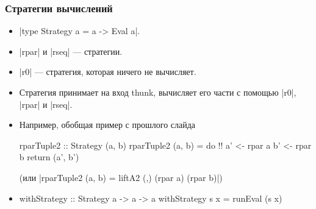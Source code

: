 \documentclass[11pt]{beamer}
\begin{document}

\begin{frame}[fragile]
  \frametitle{Стратегии вычислений}
  \begin{itemize}
    \item \haskinline|type Strategy a = a -> Eval a|.
    \item \haskinline|rpar| и \haskinline|rseq| --- стратегии.
    \item \haskinline|r0| --- стратегия, которая ничего не вычисляет.
    \item Стратегия принимает на вход thunk, вычисляет его части с помощью \haskinline|r0|, \haskinline|rpar| и \haskinline|rseq|.
    \item Например, обобщая пример с прошлого слайда
          \begin{haskell}
            rparTuple2 :: Strategy (a, b)
            rparTuple2 (a, b) = do !\pause!
              a' <- rpar a
              b' <- rpar b
              return (a', b')
          \end{haskell}
          \pause
          (или \haskinline[fontsize=\small]|rparTuple2 (a, b) = liftA2 (,) (rpar a) (rpar b)|)
    \item
          \begin{haskell}
withStrategy :: Strategy a -> a -> a
withStrategy s x = runEval (s x)
\end{haskell}
  \end{itemize}
\end{frame}
\end{document}
